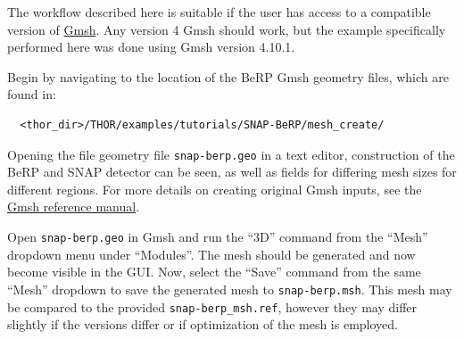 The workflow described here is suitable if the user has access to a compatible version of \href{https://gmsh.info/}{Gmsh}.
Any version 4 Gmsh should work, but the example specifically performed here was done using Gmsh version 4.10.1.

Begin by navigating to the location of the BeRP Gmsh geometry files, which are found in:
\begin{verbatim}
  <thor_dir>/THOR/examples/tutorials/SNAP-BeRP/mesh_create/
\end{verbatim}
Opening the file geometry file \verb"snap-berp.geo" in a text editor, construction of the BeRP and SNAP detector can be seen, as well as fields for differing mesh sizes for different regions.
For more details on creating original Gmsh inputs, see the \href{https://gmsh.info/doc/texinfo/gmsh.html}{Gmsh reference manual}.

Open \verb"snap-berp.geo" in Gmsh and run the ``3D'' command from the ``Mesh'' dropdown menu under ``Modules''.
The mesh should be generated and now become visible in the \ac{GUI}.
Now, select the ``Save'' command from the same ``Mesh'' dropdown to save the generated mesh to \verb"snap-berp.msh".
This mesh may be compared to the provided \verb"snap-berp_msh.ref", however they may differ slightly if the versions differ or if optimization of the mesh is employed.

